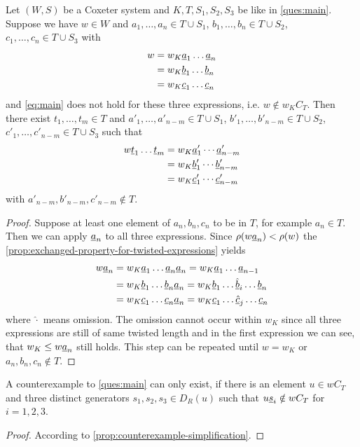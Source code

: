 \begin{prop}
	Let $(W,S)$ be a Coxeter system and $K,T,S_1,S_2,S_3$ be like in \ref{ques:main}. Suppose we have $w \in W$ and $a_1,\ldots,a_n \in T \cup S_1$, $b_1,\ldots,b_n \in T \cup S_2$, $c_1,\ldots,c_n \in T \cup S_3$ with
	\begin{align*}
	w & = w_K \underline{a}_1 \ldots \underline{a}_n \\
	  & = w_K \underline{b}_1 \ldots \underline{b}_n \\
	  & = w_K \underline{c}_1 \ldots \underline{c}_n
	\end{align*}
	and \eqref{eq:main} does not hold for these three expressions, i.e. $w \notin w_K C_T$. Then there exist $t_1,\ldots,t_m \in T$ and $a'_1,\ldots,a'_{n-m} \in T \cup S_1$, $b'_1,\ldots,b'_{n-m} \in T \cup S_2$, $c'_1,\ldots,c'_{n-m} \in T \cup S_3$ such that
	\begin{align*}
		w \underline{t}_1 \ldots \underline{t}_m & = w_K \underline{a}'_1 \cdots \underline{a}'_{n-m} \\
								 & = w_K \underline{b}'_1 \cdots \underline{b}'_{n-m} \\
								 & = w_K \underline{c}'_1 \cdots \underline{c}'_{n-m}
	\end{align*}
	with $a'_{n-m},b'_{n-m},c'_{n-m} \notin T$.

	\begin{proof}
		Suppose at least one element of $a_n,b_n,c_n$ to be in $T$, for example $a_n \in T$. Then we can apply $\underline{a}_n$ to all three expressions. Since $\rho (w \underline{a}_n) < \rho(w)$ the \ref{prop:exchanged-property-for-twisted-expressions} yields
		\begin{align*}
			w \underline{a}_n & = w_K \underline{a}_1 \ldots \underline{a}_n \underline{a}_n = w_K \underline{a}_1 \ldots \underline{a}_{n-1} \\
					  & = w_K \underline{b}_1 \ldots \underline{b}_n \underline{a}_n = w_K \underline{b}_1 \ldots \underline{\hat b}_i \ldots \underline{b}_n \\
					  & = w_K \underline{c}_1 \ldots \underline{c}_n \underline{a}_n = w_K \underline{c}_1 \ldots \underline{\hat c}_j \ldots \underline{c}_n
		\end{align*}
		where $\hat \cdot$ means omission. The omission cannot occur within $w_K$ since all three expressions are still of same twisted length and in the first expression we can see, that $w_K \leq w \underline{a}_n$ still holds. This step can be repeated until $w = w_K$ or $a_n,b_n,c_n \notin T$.
	\end{proof}
\end{prop}

\begin{lemm}
	A counterexample to \ref{ques:main} can only exist, if there
	is an element $u \in w C_T$ and three distinct generators $s_1,s_2,s_3 \in
	D_R(u)$ such that $u \underline{s}_i \notin w C_T$ for $i=1,2,3$.

	\begin{proof}
		According to \ref{prop:counterexample-simplification}.
	\end{proof}
\end{lemm}